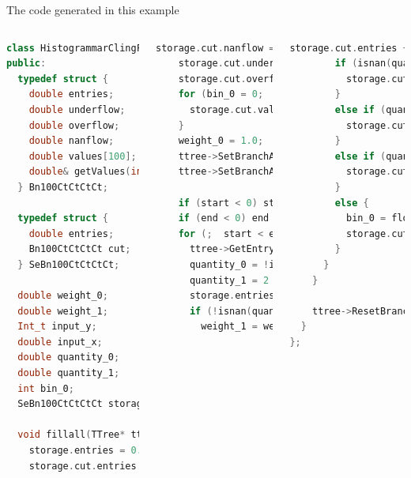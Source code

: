 \documentclass{beamer}
\begin{document}
\begin{frame}[fragile]{The code generated in this example}
\vspace{0.5 cm}
\begin{columns}
\begin{lstlisting}[language=cpp, basicstyle=\ttfamily\fontsize{5}{4}\selectfont]
class HistogrammarClingFiller_0 {
public:
  typedef struct {
    double entries;
    double underflow;
    double overflow;
    double nanflow;
    double values[100];
    double& getValues(int i) { return values[i]; }
  } Bn100CtCtCtCt;

  typedef struct {
    double entries;
    Bn100CtCtCtCt cut;
  } SeBn100CtCtCtCt;

  double weight_0;
  double weight_1;
  Int_t input_y;
  double input_x;
  double quantity_0;
  double quantity_1;
  int bin_0;
  SeBn100CtCtCtCt storage;

  void fillall(TTree* ttree, Long64_t start, Long64_t end) {
    storage.entries = 0.0;
    storage.cut.entries = 0.0;
\end{lstlisting}

\begin{lstlisting}[language=cpp, basicstyle=\ttfamily\fontsize{5}{4}\selectfont]
    storage.cut.nanflow = 0.0;
    storage.cut.underflow = 0.0;
    storage.cut.overflow = 0.0;
    for (bin_0 = 0;  bin_0 < 100;  ++bin_0) {
      storage.cut.values[bin_0] = 0.0;
    }
    weight_0 = 1.0;
    ttree->SetBranchAddress("x", &input_x);
    ttree->SetBranchAddress("y", &input_y);

    if (start < 0) start = 0;
    if (end < 0) end = ttree->GetEntries();
    for (;  start < end;  ++start) {
      ttree->GetEntry(start);
      quantity_0 = !input_y;
      quantity_1 = 2 * input_x;
      storage.entries += weight_0;
      if (!isnan(quantity_0)  &&  quantity_0 > 0.0) {
        weight_1 = weight_0 * quantity_0;
\end{lstlisting}

\begin{lstlisting}[language=cpp, basicstyle=\ttfamily\fontsize{5}{4}\selectfont]
        storage.cut.entries += weight_1;
        if (isnan(quantity_1)) {
          storage.cut.nanflow += weight_1;
        }
        else if (quantity_1 < -10.0) {
          storage.cut.underflow += weight_1;
        }
        else if (quantity_1 >= 10.0) {
          storage.cut.overflow += weight_1;
        }
        else {
          bin_0 = floor((quantity_1 - -10.0) * 5.0);
          storage.cut.values[bin_0] += weight_1;
        }
      }
    }

    ttree->ResetBranchAddresses();
  }
};
\end{lstlisting}
\end{columns}
\end{frame}
\end{document}
